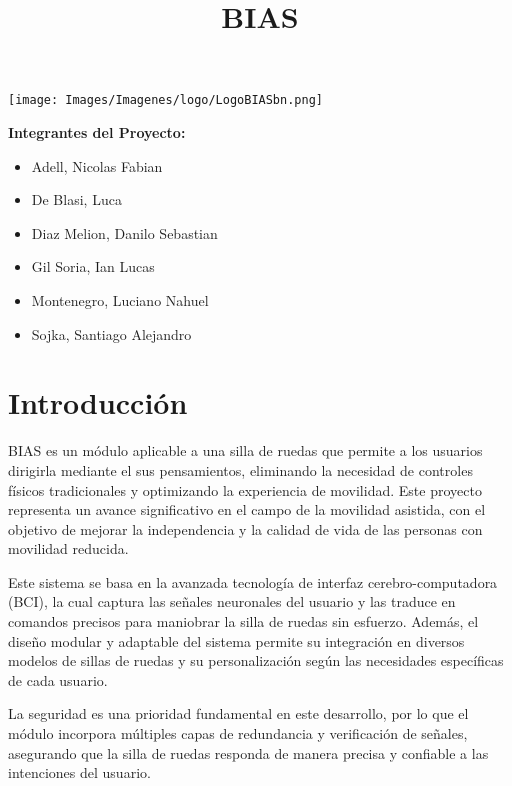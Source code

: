 \documentclass{article}
\date{}
\begin{document}
 

\begin{center}
    \texttt{[image: Images/Imagenes/logo/LogoBIASbn.png]}\\ 
\end{center}
    
\title{BIAS} 

\vspace{1cm} 

\textbf{Integrantes del Proyecto:} 

\begin{itemize}
    \item Adell, Nicolas Fabian
    \item De Blasi, Luca
    \item Diaz Melion, Danilo Sebastian
    \item Gil Soria, Ian Lucas
    \item Montenegro, Luciano Nahuel
    \item Sojka, Santiago Alejandro
\end{itemize}

\tableofcontents 

\newpage 

\section{Introducción}

BIAS es un módulo aplicable a una silla de ruedas que permite a los usuarios dirigirla mediante el sus pensamientos, eliminando la necesidad de controles físicos tradicionales y optimizando la experiencia de movilidad. Este proyecto representa un avance significativo en el campo de la movilidad asistida, con el objetivo de mejorar la independencia y la calidad de vida de las personas con movilidad reducida.

Este sistema se basa en la avanzada tecnología de interfaz cerebro-computadora (BCI), la cual captura las señales neuronales del usuario y las traduce en comandos precisos para maniobrar la silla de ruedas sin esfuerzo. Además, el diseño modular y adaptable del sistema permite su integración en diversos modelos de sillas de ruedas y su personalización según las necesidades específicas de cada usuario. 

La seguridad es una prioridad fundamental en este desarrollo, por lo que el módulo incorpora múltiples capas de redundancia y verificación de señales, asegurando que la silla de ruedas responda de manera precisa y confiable a las intenciones del usuario. 
\end{document}
